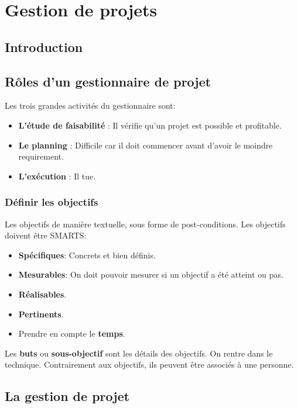 \section{Gestion de projets}



\subsection{Introduction}



\subsection{Rôles d'un gestionnaire de projet}
Les trois grandes activités du gestionnaire sont:
\begin{itemize}
    \item \textbf{L’étude de faisabilité} : Il vérifie qu’un projet est possible et profitable.
    \item \textbf{Le planning} : Difficile car il doit commencer avant d’avoir le moindre requirement.
    \item \textbf{L’exécution} : Il tue.
\end{itemize}



\subsubsection{Définir les objectifs}
Les objectifs de manière textuelle, sous forme de post-conditions.
Les objectifs doivent être SMARTS:
\begin{itemize}
    \item \textbf{Spécifiques}: Concrets et bien définis.
    \item \textbf{Mesurables}: On doit pouvoir mesurer si un objectif a été atteint ou pas.
    \item \textbf{Réalisables}.
    \item \textbf{Pertinents}.
    \item Prendre en compte le \textbf{temps}.
\end{itemize}
Les \textbf{buts} ou \textbf{sous-objectif} sont les détails des objectifs. On rentre dans le technique. Contrairement aux objectifs, ils peuvent être associés à une personne.



\subsection{La gestion de projet}



